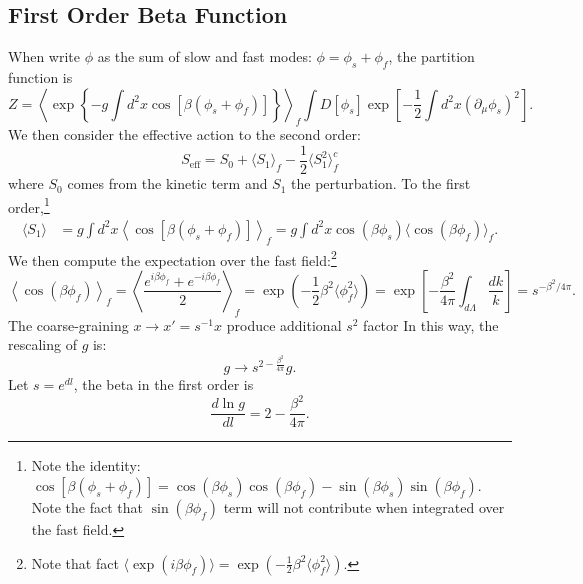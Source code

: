 \documentclass[aps,prb,superscriptaddress,nofootinbib]{revtex4}
\begin{document}
\subsection{First Order Beta Function}
When write $\phi$ as the sum of slow and fast modes: $\phi=\phi_s+\phi_f$, the partition function is
\begin{equation}
	Z = \left\langle\exp\left\{-g \int d^2 x \cos\left[\beta(\phi_s+\phi_f)\right] \right\}\right\rangle_f \int D[\phi_s] \exp\left[-\frac{1}{2}\int d^2x (\partial_\mu\phi_s)^2\right].
\end{equation}
We then consider the effective action to the second order:
\begin{equation}
	S_{\mathrm{eff}} = S_0 + \langle S_1\rangle_f - \frac{1}{2}\langle S_1^2\rangle_f^c
\end{equation}
where $S_0$ comes from the kinetic term and $S_1$ the perturbation.
To the first order,\footnote{Note the identity: $\cos\left[\beta(\phi_s+\phi_f)\right]=\cos(\beta\phi_s)\cos(\beta\phi_f)-\sin(\beta\phi_s)\sin(\beta\phi_f)$. Note the fact that $\sin(\beta\phi_f)$ term will not contribute when integrated over the fast field.}
\begin{equation}
\begin{aligned}
	\langle S_1\rangle &= g \int d^2 x \left\langle\cos\left[\beta(\phi_s+\phi_f)\right] \right\rangle_f 
	= g \int d^2 x \cos(\beta\phi_s)\langle\cos(\beta\phi_f)\rangle_f.
\end{aligned}
\end{equation}
We then compute the expectation over the fast field:\footnote{Note that fact $\langle \exp(i\beta\phi_f)\rangle = \exp(-\frac{1}{2}\beta^2 \langle\phi_f^2\rangle)$.}
\begin{equation}
	\left\langle \cos(\beta\phi_f)\right\rangle_f
	= \left\langle \frac{e^{i\beta\phi_f} + e^{-i\beta\phi_f}}{2}\right\rangle_f
	= \exp\left({-\frac{1}{2}\beta^2\langle\phi_f^2\rangle}\right) 
	= \exp\left[-\frac{\beta^2}{4\pi}\int_{d\Lambda}\frac{dk}{k} \right] 
	= s^{-\beta^2/4\pi}.
\end{equation}
The coarse-graining $x\rightarrow x'=s^{-1}x$ produce additional $s^{2}$ factor
In this way, the rescaling of $g$ is:
\begin{equation}
	g \rightarrow s^{2-\frac{\beta^2}{4\pi}} g.
\end{equation}
Let $s=e^{dl}$, the beta in the first order is
\begin{equation}
	\frac{d \ln g}{dl} = 2-\frac{\beta^2}{4\pi}.
\end{equation}
\end{document}
